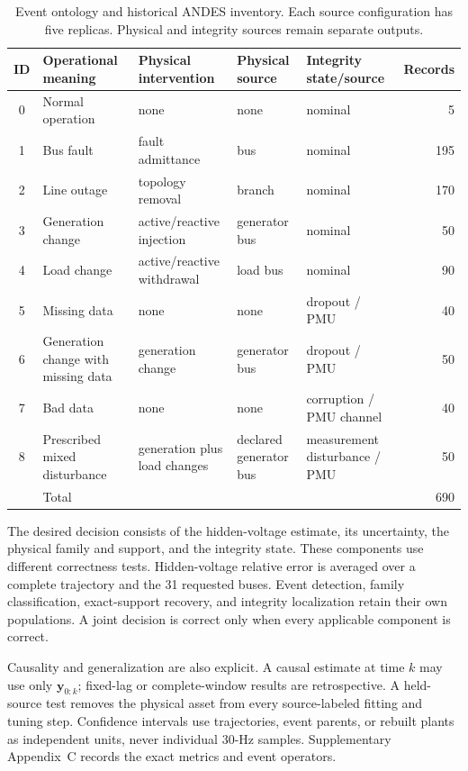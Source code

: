 \begin{table}[t]
\caption{Event ontology and historical ANDES inventory. Each source configuration has five replicas. Physical and integrity sources remain separate outputs.}
\label{tab:event-ontology}
\centering
\footnotesize
\begin{tabularx}{\textwidth}{@{}cXlllr@{}}
\toprule
ID & Operational meaning & Physical intervention & Physical source & Integrity state/source & Records \\
\midrule
0 & Normal operation & none & none & nominal & 5 \\
1 & Bus fault & fault admittance & bus & nominal & 195 \\
2 & Line outage & topology removal & branch & nominal & 170 \\
3 & Generation change & active/reactive injection & generator bus & nominal & 50 \\
4 & Load change & active/reactive withdrawal & load bus & nominal & 90 \\
5 & Missing data & none & none & dropout / PMU & 40 \\
6 & Generation change with missing data & generation change & generator bus & dropout / PMU & 50 \\
7 & Bad data & none & none & corruption / PMU channel & 40 \\
8 & Prescribed mixed disturbance & generation plus load changes & declared generator bus & measurement disturbance / PMU & 50 \\
\midrule
 & Total & & & & 690 \\
\bottomrule
\end{tabularx}
\end{table}

The desired decision consists of the hidden-voltage estimate, its uncertainty, the physical family and support, and the integrity state. These components use different correctness tests. Hidden-voltage relative error is averaged over a complete trajectory and the 31 requested buses. Event detection, family classification, exact-support recovery, and integrity localization retain their own populations. A joint decision is correct only when every applicable component is correct.

Causality and generalization are also explicit. A causal estimate at time $k$ may use only $\bm y_{0:k}$; fixed-lag or complete-window results are retrospective. A held-source test removes the physical asset from every source-labeled fitting and tuning step. Confidence intervals use trajectories, event parents, or rebuilt plants as independent units, never individual 30-Hz samples. Supplementary Appendix~C records the exact metrics and event operators.

